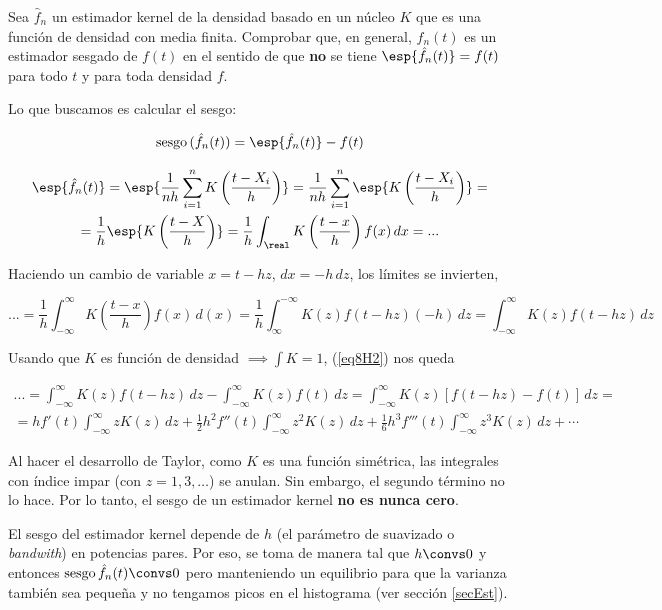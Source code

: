 \newpage
\begin{problem}[8] Sea $\hat{f}_n$ un estimador kernel de la densidad basado en un núcleo $K$ que es una función de densidad con media finita. Comprobar que, en general, $\hat{f}_n(t)$ es un estimador sesgado de $f(t)$ en el sentido de que \textbf{no} se tiene $\esp{\hat{f}_n(t)} = f(t)$ para todo $t$ y para toda densidad $f$.

\solution

Lo que buscamos es calcular el sesgo:

\begin{equation} \label{eq8H2}
\text{sesgo}\,(\hat{f}_n(t)) = \esp{\hat{f}_n(t)} - f(t)
\end{equation}

\begin{gather*}
\esp{\hat{f}_n(t)} =
\esp{\frac{1}{nh}\sum_{i=1}^n K \left(\frac{t-X_i}{h}\right)} =
\frac{1}{nh}\sum_{i=1}^n \esp{K\left(\frac{t-X_i}{h}\right)} =\\
= \frac{1}{h} \esp{K\left(\frac{t-X}{h}\right)} =
\frac{1}{h} \int_\real K \left(\frac{t-x}{h}\right) f(x) \,dx = ...
\end{gather*}

Haciendo un cambio de variable $x = t-hz$, $dx = -h\,dz$, los límites se invierten,

\[
... = \frac{1}{h} \int_{-\infty}^\infty K \left(\frac{t-x}{h}\right) f(x) \,d(x) =
\frac{1}{h} \int_\infty^{-\infty} K(z) f(t-hz) (- h) \,dz =
\int_{-\infty}^\infty K(z) f(t-hz)\,dz
\]

Usando que $K$ es función de densidad $\implies \int K = 1$, (\ref{eq8H2}) nos queda

\begin{gather*}
... = \int_{-\infty}^\infty K(z) f(t-hz)\,dz - \int_{-\infty}^\infty K(z) f(t)\, dz =
\int_{-\infty}^\infty K(z) \left[f(t-hz)-f(t)\right]\,dz =\\
= hf'(t)\int_{-\infty}^\infty zK(z)\,dz + \frac{1}{2} h^2 f''(t) \int_{-\infty}^\infty z^2K(z)\,dz + \frac{1}{6}h^3 f'''(t) \int_{-\infty}^\infty z^3K(z)\,dz + \dotsb  
\end{gather*}

Al hacer el desarrollo de Taylor, como $K$ es una función simétrica, las integrales con índice impar (con $z=1, 3,\dotsc$) se anulan. Sin embargo, el segundo término no lo hace. Por lo tanto, el sesgo de un estimador kernel \textbf{no es nunca cero}. 

El sesgo del estimador kernel depende de $h$ (el parámetro de suavizado o \textit{bandwith}) en potencias pares. Por eso, se toma de manera tal que $h\convs 0$ y entonces $\text{sesgo}\,\hat{f}_n(t) \convs 0$ pero manteniendo un equilibrio para que la varianza también sea pequeña y no tengamos picos en el histograma (ver sección \ref{secEst}).

\end{problem}

